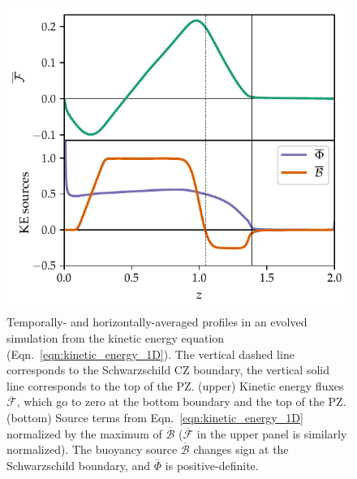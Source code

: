 \documentclass[twocolumn]{aastex631}
\renewcommand{\bar}[1]{\overline{#1}}
\begin{document}
\begin{figure}[t!]
\centering
\includegraphics[width=\columnwidth]{theory_profiles.pdf}
\caption{
Temporally- and horizontally-averaged profiles in an evolved simulation from the kinetic energy equation (Eqn.~\ref{eqn:kinetic_energy_1D}).
The vertical dashed line corresponds to the Schwarzschild CZ boundary, the vertical solid line corresponds to the top of the PZ.
(upper) Kinetic energy fluxes $\bar{\mathcal{F}}$, which go to zero at the bottom boundary and the top of the PZ.
(bottom) Source terms from Eqn.~\ref{eqn:kinetic_energy_1D} normalized by the maximum of $\overline{\mathcal{B}}$ ($\bar{\mathcal{F}}$ in the upper panel is similarly normalized).
The buoyancy source $\bar{\mathcal{B}}$ changes sign at the Schwarzschild boundary, and $\bar{\Phi}$ is positive-definite.
\label{fig:theory_profiles}
}
\end{figure}
\end{document}
